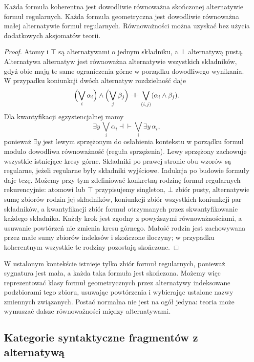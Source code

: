 \begin{stwierdzenie}\label{cat:prop:cl-geometric-normal-form}
Każda formuła koherentna jest dowodliwie równoważna skończonej alternatywie formuł regularnych. Każda formuła geometryczna jest dowodliwie równoważna małej alternatywie formuł regularnych. Równoważności można uzyskać bez użycia dodatkowych aksjomatów teorii.
\end{stwierdzenie}
\begin{proof}
Atomy i $\top$ są alternatywami o jednym składniku, a $\bot$ alternatywą pustą. Alternatywa alternatyw jest równoważna alternatywie wszystkich składników, gdyż obie mają te same ograniczenia górne w porządku dowodliwego wynikania. W przypadku koniunkcji dwóch alternatyw rozdzielność daje
\[
 \Bigl(\bigvee_i\alpha_i\Bigr)\wedge
 \Bigl(\bigvee_j\beta_j\Bigr)
 \dashv\vdash
 \bigvee_{(i,j)}(\alpha_i\wedge\beta_j).
\]
Dla kwantyfikacji egzystencjalnej mamy
\[
 \exists y\,\bigvee_i\alpha_i
 \dashv\vdash
 \bigvee_i\exists y\,\alpha_i,
\]
ponieważ $\exists y$ jest lewym sprzężonym do osłabienia kontekstu w porządku formuł modulo dowodliwa równoważność (reguła sprzężenia). Lewy sprzężony zachowuje wszystkie istniejące kresy górne. Składniki po prawej stronie obu wzorów są regularne, jeżeli regularne były składniki wyjściowe. Indukcja po budowie formuły daje tezę. Możemy przy tym zdefiniować konkretną rodzinę formuł regularnych rekurencyjnie: atomowi lub $\top$ przypisujemy singleton, $\bot$ zbiór pusty, alternatywie sumę zbiorów rodzin jej składników, koniunkcji zbiór wszystkich koniunkcji par składników, a kwantyfikacji zbiór formuł otrzymanych przez skwantyfikowanie każdego składnika. Każdy krok jest zgodny z powyższymi równoważnościami, a usuwanie powtórzeń nie zmienia kresu górnego. Małość rodzin jest zachowywana przez małe sumy zbiorów indeksów i skończone iloczyny; w przypadku koherentnym wszystkie te rodziny pozostają skończone.
\end{proof}

W ustalonym kontekście istnieje tylko zbiór formuł regularnych, ponieważ sygnatura jest mała, a każda taka formuła jest skończona. Możemy więc reprezentować klasy formuł geometrycznych przez alternatywy indeksowane podzbiorami tego zbioru, usuwając powtórzenia i wybierając ustalone nazwy zmiennych związanych. Postać normalna nie jest na ogół jedyna: teoria może wymuszać dalsze równoważności między alternatywami.

\subsection{Kategorie syntaktyczne fragmentów z alternatywą}

